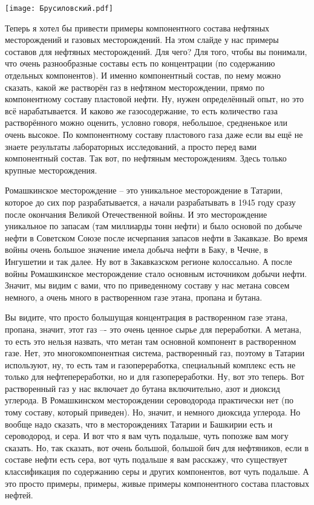\documentclass[main.tex]{subfiles}
\begin{document}
\begin{center}
\texttt{[image: Брусиловский.pdf]}
\end{center}

Теперь я хотел бы привести примеры компонентного состава нефтяных месторождений и газовых месторождений.
На этом слайде у нас примеры составов для нефтяных месторождений.
Для чего?
Для того, чтобы вы понимали, что очень разнообразные составы есть по концентрации (по содержанию отдельных компонентов).
И именно компонентный состав, по нему можно сказать, какой же растворён газ в нефтяном месторождении, прямо по компонентному составу пластовой нефти.
Ну, нужен определённый опыт, но это всё нарабатывается.
И каково же газосодержание, то есть количество газа растворённого можно оценить, условно говоря, небольшое, средненькое или очень высокое.
По компонентному составу пластового газа даже если вы ещё не знаете результаты лабораторных исследований, а просто перед вами компонентный состав.
Так вот, по нефтяным месторождениям.
Здесь только крупные месторождения.

Ромашкинское месторождение -- это уникальное месторождение в Татарии, которое до сих пор разрабатывается, а начали разрабатывать в 1945 году сразу после окончания Великой Отечественной войны.
И это месторождение уникальное по запасам (там миллиарды тонн нефти) и было основой по добыче нефти в Советском Союзе после исчерпания запасов нефти в Закавказе.
Во время войны очень большое значение имела добыча нефти в Баку, в Чечне, в Ингушетии и так далее.
Ну вот в Закавказском регионе колоссально.
А после войны Ромашкинское месторождение стало основным источником добычи нефти.
Значит, мы видим с вами, что по приведенному составу у нас метана совсем немного, а очень много в растворенном газе этана, пропана и бутана.

Вы видите, что просто большущая концентрация в растворенном газе этана, пропана, значит, этот газ –- это очень ценное сырье для переработки.
А метана, то есть это нельзя назвать, что метан там основной компонент в растворенном газе.
Нет, это многокомпонентная система, растворенный газ, поэтому в Татарии используют, ну, то есть там и газопереработка, специальный комплекс есть не только для нефтепереработки, но и для газопереработки.
Ну, вот это теперь.
Вот растворенный газ у нас включает до бутана включительно, азот и диоксид углерода.
В Ромашкинском месторождении сероводорода практически нет (по тому составу, который приведен).
Но, значит, и немного диоксида углерода.
Но вообще надо сказать, что в месторождениях Татарии и Башкирии есть и сероводород, и сера.
И вот что я вам чуть подальше, чуть попозже вам могу сказать.
Но, так сказать, вот очень большой, большой бич для нефтяников, если в составе нефти есть сера, вот чуть подальше я вам расскажу, что существует классификация по содержанию серы и других компонентов, вот чуть подальше.
А это просто примеры, примеры, живые примеры компонентного состава пластовых нефтей.
\end{document}
